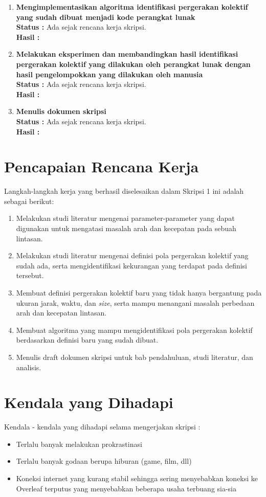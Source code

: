 \documentclass[a4paper,twoside]{article}
\begin{document}
\begin{enumerate}
		\item \textbf{Mengimplementasikan algoritma identifikasi pergerakan kolektif yang sudah dibuat menjadi kode perangkat lunak} \\
		{\bf Status :} Ada sejak rencana kerja skripsi.\\
		{\bf Hasil :}

		\item \textbf{Melakukan eksperimen dan membandingkan hasil identifikasi pergerakan kolektif yang dilakukan oleh perangkat lunak dengan hasil pengelompokkan yang dilakukan oleh manusia}\\
		{\bf Status :} Ada sejak rencana kerja skripsi.\\
		{\bf Hasil :}

		\item \textbf{Menulis dokumen skripsi}\\
		{\bf Status :} Ada sejak rencana kerja skripsi.\\
		{\bf Hasil :} \lipsum[1]
	\end{enumerate}

\section{Pencapaian Rencana Kerja}
Langkah-langkah kerja yang berhasil diselesaikan dalam Skripsi 1 ini adalah sebagai berikut:
\begin{enumerate}
\item Melakukan studi literatur mengenai parameter-parameter yang dapat digunakan untuk mengatasi masalah arah dan kecepatan pada sebuah lintasan.
\item Melakukan studi literatur mengenai definisi pola pergerakan kolektif yang sudah ada, serta mengidentifikasi kekurangan yang terdapat pada definisi tersebut.
\item Membuat definisi pergerakan kolektif baru yang tidak hanya bergantung pada ukuran jarak, waktu, dan \textit{size}, serta mampu menangani masalah perbedaan arah dan kecepatan lintasan.
\item Membuat algoritma yang mampu mengidentifikasi pola pergerakan kolektif berdasarkan definisi baru yang sudah dibuat.
\item Menulis draft dokumen skripsi untuk bab pendahuluan, studi literatur, dan analisis.
\end{enumerate}

\iffalse 

\section{Kendala yang Dihadapi}
Kendala - kendala yang dihadapi selama mengerjakan skripsi :
\begin{itemize}
	\item Terlalu banyak melakukan prokrastinasi
	\item Terlalu banyak godaan berupa hiburan (game, film, dll)
	\item Koneksi internet yang kurang stabil sehingga sering menyebabkan koneksi ke Overleaf terputus yang menyebabkan beberapa usaha terbuang sia-sia
\end{itemize}
\end{document}
